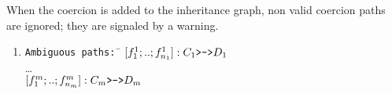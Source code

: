 \begin{ErrMsgs}
\item {\qualid} 
\item {\qualid} 
\item {}
\item {\qualid} 
\item {}
\item {}
\item {\qualid} 
\item {}

\end{ErrMsgs}

When the coercion {\qualid} is added to the inheritance graph, non
valid coercion paths are ignored; they are signaled by a warning.
\\[0.3cm]
\begin{enumerate}
\item \begin{tabbing}
{\tt Ambiguous paths: }\= $[f_1^1;..;f_{n_1}^1] : C_1\mbox{\tt >->}D_1$\\
                       \> {\ldots} \\
                       \>$[f_1^m;..;f_{n_m}^m] : C_m\mbox{\tt >->}D_m$
      \end{tabbing}
\end{enumerate}


